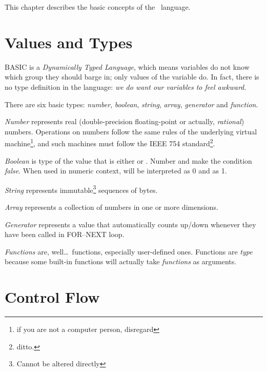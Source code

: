 \quad
{}

This chapter describes the basic concepts of the \tbas\ language.


\section{Values and Types}
\label{valuesandtypes}

BASIC is a \emph{Dynamically Typed Language}, which means variables do not know which group they should barge in; only values of the variable do. In fact, there is no type definition in the language: \emph{we do want our variables to feel awkward.}

There are six basic types: \emph{number}, \emph{boolean}, \emph{string},  \emph{array}, \emph{generator} and \emph{function}.

\emph{Number} represents real (double-precision floating-point or actually, \emph{rational}) numbers. Operations on numbers follow the same rules of the underlying virtual machine\footnote{if you are not a computer person, disregard}, and such machines must follow the IEEE 754 standard\footnote{ditto.}. 

\emph{Boolean} is type of the value that is either  or . Number  and  make the condition \emph{false}. When used in numeric context,  will be interpreted as 0 and  as 1.

\emph{String} represents immutable\footnote{Cannot be altered directly} sequences of bytes.

\emph{Array} represents a collection of numbers in one or more dimensions.

\emph{Generator} represents a value that automatically counts up/down whenever they have been called in FOR--NEXT loop.

\emph{Functions} are, well\ldots\ functions, especially user-defined ones. Functions are \emph{type} because some built-in functions will actually take \emph{functions} as arguments.

\section{Control Flow}

